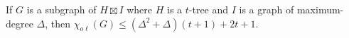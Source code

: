 \documentclass{patmorin}
\newcommand{\oddc}{\chi_{o\ell}}
\begin{document}
\begin{thm}\label{product_structure_result_delta}
  If $G$ is a subgraph of $H\boxtimes I$ where $H$ is a $t$-tree and $I$ is a graph of maximum-degree $\Delta$, then $\oddc(G)\le(\Delta^2+\Delta)(t+1)+2t+1$.
\end{thm}



%
%
%



\end{document}

